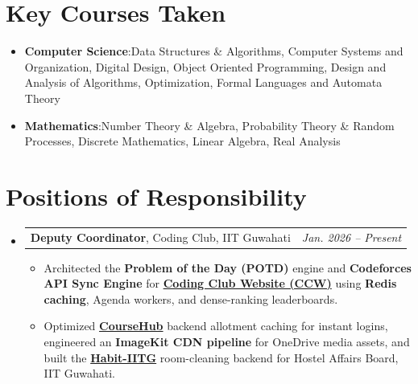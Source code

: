 \documentclass[a4paper,11pt]{article}
\makeatletter
\newcommand{\resumeItem}[2]{
  \item{
    \textbf{#1}{:\hspace{0.5mm}#2 \vspace{-0.5mm}}
  }
}
\newcommand{\resumePOR}[3]{
\vspace{1mm}\item
    \begin{tabular*}{0.97\textwidth}[t]{l@{\extracolsep{\fill}}r}
        \textbf{#1},\hspace{0.3mm}#2 & \textit{\small{#3}} 
    \end{tabular*}
    \vspace{-2.5mm}
}
\newcommand{\resumeSubItem}[2]{\resumeItem{#1}{#2}\vspace{-4pt}}
\newcommand{\resumeSubHeadingListStart}{\begin{itemize}[leftmargin=*,labelsep=0mm]}
\newcommand{\resumeHeadingSkillStart}{\begin{itemize}[leftmargin=*,itemsep=1.7mm, rightmargin=2ex]}
\newcommand{\resumeItemListStart}{\begin{justify}\begin{itemize}[leftmargin=3ex, rightmargin=2ex, noitemsep,labelsep=1.2mm,itemsep=0mm]\small}
\newcommand{\resumeSubHeadingListEnd}{\end{itemize}\vspace{1.5mm}}
\newcommand{\resumeHeadingSkillEnd}{\end{itemize}\vspace{-2mm}}
\newcommand{\resumeItemListEnd}{\end{itemize}\end{justify}\vspace{-2mm}}
\makeatother
\begin{document}
\section{Key Courses Taken}
\vspace{+0.7mm}
\resumeHeadingSkillStart
\resumeSubItem{Computer Science}
 {Data Structures \& Algorithms, Computer Systems and Organization, Digital Design, Object Oriented Programming, Design and Analysis of Algorithms, Optimization, Formal Languages and Automata Theory}
\vspace{-0.7mm}
\resumeSubItem{Mathematics}
    {Number Theory \& Algebra, Probability Theory \& Random Processes, Discrete Mathematics, Linear Algebra, Real Analysis}
 \resumeHeadingSkillEnd
 \vspace{-2mm}

\section{Positions of Responsibility}
\vspace{-1.5mm}
\resumeSubHeadingListStart
\resumePOR{Deputy Coordinator}
    { Coding Club, IIT Guwahati}
    {Jan. 2026 -- Present}
    
    \resumeItemListStart
    \vspace{-0.3mm}
    \item {Architected the \textbf{Problem of the Day (POTD)} engine and \textbf{Codeforces API Sync Engine} for \href{https://github.com/Coding-Club-IITG/ccw}{\textbf{Coding Club Website (CCW)}} using \textbf{Redis caching}, Agenda workers, and dense-ranking leaderboards.}
    \item {Optimized \href{https://github.com/Coding-Club-IITG/courseHub}{\textbf{CourseHub}} backend allotment caching for instant logins, engineered an \textbf{ImageKit CDN pipeline} for OneDrive media assets, and built the \href{https://github.com/Coding-Club-IITG/iitghabapp}{\textbf{Habit-IITG}} room-cleaning backend for Hostel Affairs Board, IIT Guwahati.}
    \resumeItemListEnd
\resumeSubHeadingListEnd
\vspace{-3mm}

\end{document}
